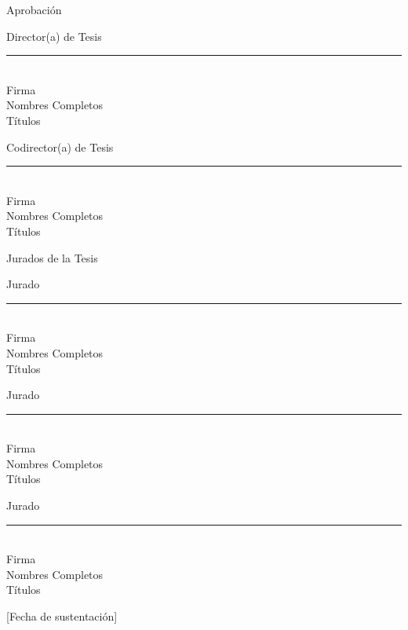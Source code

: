 \thispagestyle{empty} %

\begin{center}
Aprobación
\end{center}

\vspace{1cm}

\noindent
\begin{minipage}[t]{0.48\textwidth}
\raggedright
Director(a) de Tesis\\[1.0cm]
\rule{7cm}{0.4pt}\\
Firma\\
Nombres Completos\\
Títulos
\end{minipage}
\hfill
\begin{minipage}[t]{0.48\textwidth}
\raggedright
Codirector(a) de Tesis\\[1.0cm]
\rule{7cm}{0.4pt}\\
Firma\\
Nombres Completos\\
Títulos
\end{minipage}

\vspace{1.2cm}

\begin{center}
Jurados de la Tesis
\end{center}

\vspace{0.8cm}

\noindent
\begin{minipage}[t]{0.48\textwidth}
\raggedright
Jurado\\[1.0cm]
\rule{7cm}{0.4pt}\\
Firma\\
Nombres Completos\\
Títulos
\end{minipage}
\hfill
\begin{minipage}[t]{0.48\textwidth}
\raggedright
Jurado\\[1.0cm]
\rule{7cm}{0.4pt}\\
Firma\\
Nombres Completos\\
Títulos
\end{minipage}

\vspace{1.0cm}

\noindent
\begin{minipage}[t]{0.48\textwidth}
\raggedright
Jurado\\[1.0cm]
\rule{7cm}{0.4pt}\\
Firma\\
Nombres Completos\\
Títulos
\end{minipage}

\vfill
\begin{center}
[Fecha de sustentación]
\end{center}
